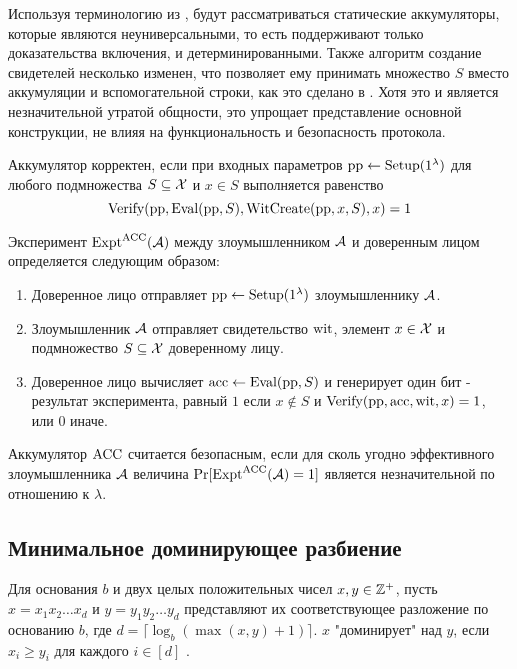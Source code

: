 Используя терминологию из \cite{cryptoeprint:2015/087}, будут рассматриваться статические аккумуляторы, которые являются неуниверсальными, то есть поддерживают только доказательства включения, и детерминированными.
Также алгоритм создание свидетелей несколько изменен, что позволяет ему принимать множество $S$ вместо аккумуляции и вспомогательной строки, как это сделано в \cite{cryptoeprint:2015/087}.
Хотя это и является незначительной утратой общности, это упрощает представление основной конструкции, не влияя на функциональность и безопасность протокола.

\begin{definition}
	Аккумулятор корректен, если при входных параметров $\text{pp} \leftarrow \text{Setup}(1^\lambda)$ для любого подмножества $S \subseteq \mathcal{X}$ и $x \in S$ выполняется равенство
	$$
	\text{Verify}(\text{pp}, \text{Eval}(\text{pp}, S), \text{WitCreate}(\text{pp}, x, S), x) = 1
	$$
\end{definition}

\begin{definition}[$\ExptACC$]
	Эксперимент $\text{Expt}^\text{ACC}(\mathcal{A})$ между злоумышленником $\mathcal{A}$ и доверенным лицом определяется следующим образом:
	\begin{enumerate}
		\item Доверенное лицо отправляет $\text{pp} \leftarrow \text{Setup}(1^\lambda)$ злоумышленнику $\mathcal{A}$.
		\item Злоумышленник $\mathcal{A}$ отправляет свидетельство $\text{wit}$, элемент $x \in \mathcal{X}$ и подмножество $S \subseteq \mathcal{X}$ доверенному лицу.
		\item Доверенное лицо вычисляет $\text{acc} \leftarrow \text{Eval}(\text{pp}, S)$ и генерирует один бит - результат эксперимента, равный $1$ если $x \notin S$ и $\text{Verify}(\text{pp}, \text{acc}, \text{wit}, x) = 1$, или $0$ иначе.
	\end{enumerate}
\end{definition}

\begin{definition}
	Аккумулятор $\text{ACC}$ считается безопасным, если для сколь угодно эффективного злоумышленника $\mathcal{A}$ величина $\Pr[\text{Expt}^\text{ACC}(\mathcal{A}) = 1]$ является незначительной по отношению к $\lambda$.
\end{definition}

\subsection{Минимальное доминирующее разбиение} %
\begin{definition}[Доминирование]
	Для основания $b$ и двух целых положительных чисел $x, y \in \mathbb{Z}^+$, пусть $x = x_1 x_2 \dots x_d$ и $y = y_1 y_2 \dots y_d$ представляют их соответствующее разложение по основанию $b$, где $d = \lceil \log_b(\max(x, y) + 1) \rceil$.
	$x$ "доминирует" над $y$, если $x_i \geq y_i$ для каждого $i \in [d]$ \cite{BonehShoup2023}.
\end{definition}

